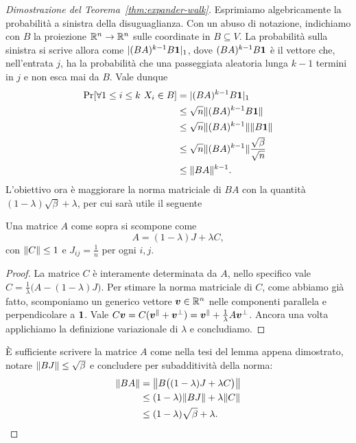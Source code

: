 \begin{proof}[Dimostrazione del Teorema~\ref{thm:expander-walk}]
	Esprimiamo algebricamente la probabilità a sinistra della disuguaglianza.
	Con un abuso di notazione, indichiamo con $B$ la proiezione $\mathbb{R}^n \to \mathbb{R}^n$
	sulle coordinate in $B \subseteq V$. La probabilità sulla sinistra si
	scrive allora come $\lvert (B A)^{k - 1} B \bm{1} \rvert_1$, dove
	$(B A)^{k - 1} B \bm{1}$ è il vettore che, nell'entrata $j$, ha la probabilità
	che una passeggiata aleatoria lunga $k - 1$ termini in $j$ e non esca mai
	da $B$.
	Vale dunque
	\begin{align*}
		\Pr[\forall 1 \le i \le k \ X_i \in B] &=
			\lvert (B A)^{k - 1} B \bm{1} \rvert_1 \\
		&\le \sqrt{n} \lVert(B A)^{k - 1} B \bm{1}\rVert \\
		&\le \sqrt{n} \lVert(B A)^{k - 1}\rVert \lVert B \bm{1}\rVert \\
		&\le \sqrt{n} \lVert(B A)^{k - 1}\rVert \frac{\sqrt{\beta}}{\sqrt{n}} \\
		&\le \lVert B A\rVert^{k - 1}.
	\end{align*}
	L'obiettivo ora è maggiorare la norma matriciale di $B A$ con la quantità
	$(1 - \lambda)\sqrt{\beta} + \lambda$, per cui sarà utile il seguente
	\begin{lemma}
		Una matrice $A$ come sopra si scompone come
		\[
			A = (1 - \lambda) J + \lambda C,
		\]
		con $\lVert C\rVert \le 1$ e $J_{i j} = \frac1{n}$ per ogni $i,j$.
	\end{lemma}
	\begin{proof}
		La matrice $C$ è interamente determinata da $A$, nello specifico vale
		$C = \frac1{\lambda}\bigl( A - (1 - \lambda)J \bigr)$.
		Per stimare la norma matriciale di $C$, come abbiamo già fatto,
		scomponiamo un generico vettore $\bm{v} \in \mathbb{R}^n$ nelle componenti
		parallela e perpendicolare a $\bm{1}$.
		Vale $C \bm{v} = C (\bm{v}^\parallel + \bm{v}^\perp)
		= \bm{v}^\parallel + \frac1{\lambda} A \bm{v}^\perp$.
		Ancora una volta applichiamo la definizione variazionale di $\lambda$
		e concludiamo.
	\end{proof}

	È sufficiente scrivere la matrice $A$ come nella tesi del lemma appena
	dimostrato, notare $\lVert B J\rVert \le \sqrt{\beta}$ e concludere per
	subadditività della norma:
	\begin{align*}
		\lVert B A\rVert &= \big\lVert B \bigl( (1 - \lambda) J
			+ \lambda C \bigr) \big\rVert \\
		&\le (1 - \lambda) \lVert B J\rVert + \lambda \lVert C\rVert \\
		&\le (1 - \lambda) \sqrt{\beta} + \lambda.
	\end{align*}
\end{proof}

